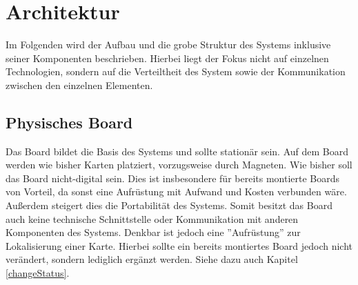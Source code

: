 \documentclass[12pt,titlepage]{scrartcl}
\begin{document}
	\section{Architektur}
	Im Folgenden wird der Aufbau und die grobe Struktur des Systems inklusive seiner Komponenten beschrieben. Hierbei liegt der Fokus nicht auf einzelnen Technologien, sondern auf die Verteiltheit des System sowie der Kommunikation zwischen den einzelnen Elementen.
		\subsection{Physisches Board}
		Das Board bildet die Basis des Systems und sollte stationär sein. Auf dem Board werden wie bisher Karten platziert, vorzugsweise durch Magneten. Wie bisher soll das Board nicht-digital sein. Dies ist insbesondere für bereits montierte Boards von Vorteil, da sonst eine Aufrüstung mit Aufwand und Kosten verbunden wäre. Außerdem steigert dies die Portabilität des Systems. Somit besitzt das Board auch keine technische Schnittstelle oder Kommunikation mit anderen Komponenten des Systems. Denkbar ist jedoch eine ''Aufrüstung'' zur Lokalisierung einer Karte. Hierbei sollte ein bereits montiertes Board jedoch nicht verändert, sondern lediglich ergänzt werden. Siehe dazu auch Kapitel \ref{changeStatus}.
\end{document}
